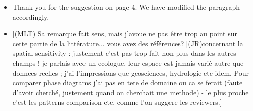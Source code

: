 \documentclass[11pt,a4paper,sans]{moderncv}        %
\begin{document}
\begin{itemize}
	\item Thank you for the suggestion on page 4. We have modified the paragraph accordingly.


	\item 
    [(MLT) Sa remarque fait sens, mais j'avoue ne pas être trop au point sur cette partie de la littérature... vous avez des références?][(JR)concernant la spatial sensitivity : justement c'est pas trop fait non plus dans les autres champs ! je parlais avec un ecologue, leur espace est jamais varié autre que donnees reelles ; j'ai l'impressions que geosciences, hydrologie etc idem. Pour comparer phase diagrams j'ai pas en tete de domaine ou ca se ferait (faute d'avoir cherché, justement quand on cherchait une methode) - le plus proche c'est les patterns comparison etc. comme l'on suggere les reviewers.]
	

\end{itemize}
\end{document}
